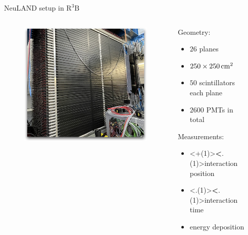 \documentclass{ikpKoeln}
\begin{document}
{\begin{frame}{NeuLAND setup in $\text{R}^3\text{B}$}
	\begin{columns}[c]
		\begin{column}{0.4\textwidth}
			\pause
			\begin{figure}
				\includegraphics[width = \textwidth]{neuland/neulandReal}
			\end{figure}
		\end{column}
		\hspace*{0.5cm}
		\begin{column}{0.3\textwidth}
			\begin{exampleblock}{}
				Geometry:\\
				\begin{itemize}
					\item $26$ planes
					\item $\qtyproduct[product-units=power]{250 x 250}{\centi\meter}$
					\item $50$ scintillators each plane
					\item $2600$ PMTs in total
				\end{itemize}
				\pause
				Measurements:\\
				\begin{itemize}
					\item \alert<+(1)>{\textbf<.(1)>{interaction position}}
					\item \alert<.(1)>{\textbf<.(1)>{interaction time}}
					\item energy deposition
				\end{itemize}
			\end{exampleblock}
		\end{column}
		\begin{column}{0.3\textwidth}
		\end{column}
	\end{columns}
	\let\thefootnote\relax{}
\end{frame}
}
\end{document}
